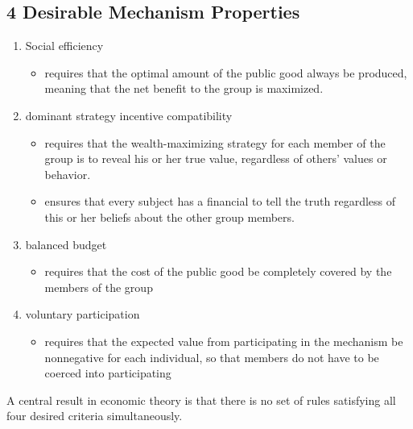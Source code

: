 \subsection{4 Desirable Mechanism Properties}
\begin{enumerate}
    \item Social efficiency
    \begin{itemize}
        \item requires that the optimal amount of the public good always be produced, meaning that the net benefit to the group is maximized.
        
    \end{itemize}
    \item dominant strategy incentive compatibility
    \begin{itemize}
        \item requires that the wealth-maximizing strategy for each member of the group is to reveal his or her true value, regardless of others' values or behavior.
        \item ensures that every subject has a financial to tell the truth regardless of this or her beliefs about the other group members.
    \end{itemize}
    \item balanced budget
    \begin{itemize}
        \item requires that the cost of the public good be completely covered by the members of the group
    \end{itemize}
    \item voluntary participation
    \begin{itemize}
        \item requires that the expected value from participating in the mechanism be nonnegative for each individual, so that members do not have to be coerced into participating
    \end{itemize}
\end{enumerate}
A central result in economic theory is that there is no set of rules satisfying all four desired criteria simultaneously.

